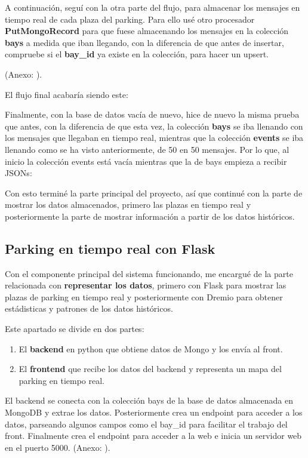 \documentclass{../../../miPlantilla}
\begin{document}
A continuación, seguí con la otra parte del flujo, para almacenar los mensajes en tiempo real de cada plaza del parking. Para ello usé otro procesador \textbf{PutMongoRecord}
para que fuese almacenando los mensajes en la colección \textbf{bays} a medida que iban llegando, con la diferencia de que antes de insertar, compruebe si el \textbf{bay\_id}
ya existe en la colección, para hacer un upsert.
\begin{center}
  {\small(Anexo: )}.
\end{center}

El flujo final acabaría siendo este:

\newpage

Finalmente, con la base de datos vacía de nuevo, hice de nuevo la misma prueba que antes, con la diferencia de que esta vez, la colección \textbf{bays} se iba llenando
con los mensajes que llegaban en tiempo real, mientras que la colección \textbf{events} se iba llenando como se ha visto anteriormente, de 50 en 50 mensajes. Por lo que,
al inicio la colección events está vacía mientras que la de bays empieza a recibir JSONs:

Con esto terminé la parte principal del proyecto, así que continué con la parte de mostrar los datos almacenados, primero las plazas en tiempo real y posteriormente la parte
de mostrar información a partir de los datos históricos.

\subsection{Parking en tiempo real con Flask}
Con el componente principal del sistema funcionando, me encargué de la parte relacionada con \textbf{representar los datos}, primero con Flask para mostrar las plazas de parking
en tiempo real y posteriormente con Dremio para obtener estádisticas y patrones de los datos históricos.

Este apartado se divide en dos partes:
\begin{enumerate}
  \item El \textbf{backend} en python que obtiene datos de Mongo y los envía al front.
  \item El \textbf{frontend} que recibe los datos del backend y representa un mapa del parking en tiempo real.
\end{enumerate}

El backend se conecta con la colección bays de la base de datos almacenada en MongoDB y extrae los datos. Posteriormente crea un 
endpoint para acceder a los datos, parseando algunos campos como el bay\_id para facilitar el trabajo del front. Finalmente crea el
endpoint para acceder a la web e inicia un servidor web en el puerto 5000.
{\small(Anexo: )}.
\end{document}
